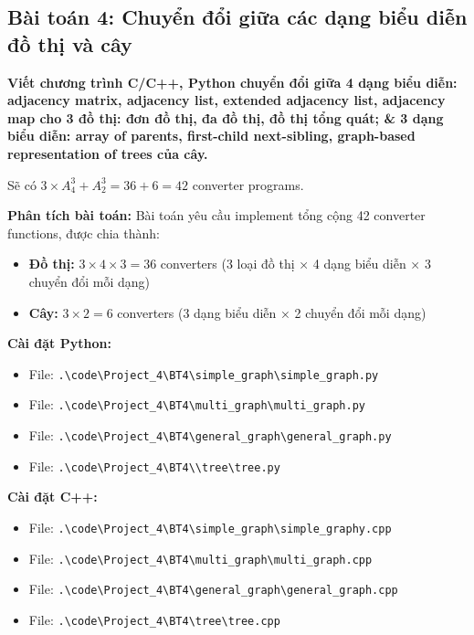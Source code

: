 \documentclass[12pt,a4paper]{article}
\begin{document}
\subsection{Bài toán 4: Chuyển đổi giữa các dạng biểu diễn đồ thị và cây}

\begin{problembox}
    \textbf{Viết chương trình C/C++, Python chuyển đổi giữa 4 dạng biểu diễn: adjacency matrix, adjacency list, extended adjacency list, adjacency map cho 3 đồ thị: đơn đồ thị, đa đồ thị, đồ thị tổng quát; \& 3 dạng biểu diễn: array of parents, first-child next-sibling, graph-based representation of trees của cây.} 
    
    Sẽ có $3 \times A_4^3 + A_2^3 = 36 + 6 = 42$ converter programs.

\end{problembox}

\textbf{Phân tích bài toán:} Bài toán yêu cầu implement tổng cộng 42 converter functions, được chia thành:

\begin{itemize}
    \item \textbf{Đồ thị:} $3 \times 4 \times 3 = 36$ converters (3 loại đồ thị × 4 dạng biểu diễn × 3 chuyển đổi mỗi dạng)
    \item \textbf{Cây:} $3 \times 2 = 6$ converters (3 dạng biểu diễn × 2 chuyển đổi mỗi dạng)
\end{itemize}

\textbf{Cài đặt Python:}
\begin{itemize}[label=\textbullet]
   \item File: \texttt{.\textbackslash code\textbackslash Project\_4\textbackslash BT4\textbackslash simple\_graph\textbackslash simple\_graph.py}
   \item  File: \texttt{.\textbackslash code\textbackslash Project\_4\textbackslash BT4\textbackslash multi\_graph\textbackslash multi\_graph.py}
   \item  File: \texttt{.\textbackslash code\textbackslash Project\_4\textbackslash BT4\textbackslash general\_graph\textbackslash general\_graph.py}
   \item  File: \texttt{.\textbackslash code\textbackslash Project\_4\textbackslash BT4\textbackslash \textbackslash tree\textbackslash tree.py}
\end{itemize}

\textbf{Cài đặt C++:}
\begin{itemize}[label=\textbullet]
   \item File: \texttt{.\textbackslash code\textbackslash Project\_4\textbackslash BT4\textbackslash simple\_graph\textbackslash simple\_graphy.cpp }
   \item File: \texttt{.\textbackslash code\textbackslash Project\_4\textbackslash BT4\textbackslash multi\_graph\textbackslash multi\_graph.cpp }
   \item File: \texttt{.\textbackslash code\textbackslash Project\_4\textbackslash BT4\textbackslash general\_graph\textbackslash general\_graph.cpp }
   \item File: \texttt{.\textbackslash code\textbackslash Project\_4\textbackslash BT4\textbackslash tree\textbackslash tree.cpp }
\end{itemize}
\newpage
\end{document}
